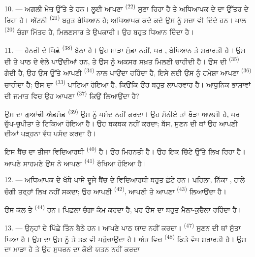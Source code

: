 10. --- ਅਗਲੀ ਮੇਜ਼ ਉੱਤੇ  ਤੇ  ਹਨ। ਲੂਈ ਆਪਣਾ
 \textsuperscript{(22)} ਸੁਣਾ ਰਿਹਾ ਹੈ ਤੇ ਅਧਿਆਪਕ ਦੇ 
ਦਾ ਉੱਤਰ ਦੇ ਰਿਹਾ ਹੈ। ਐਂਟਨੀ \textsuperscript{(21)} ਬਹੁਤ ਬੇਧਿਆਨ ਹੈ; ਅਧਿਆਪਕ ਕਦੇ
ਕਦੇ ਉਸ ਨੂੰ ਸਜ਼ਾ ਵੀ ਦਿੰਦੇ ਹਨ। ਪਾਲ \textsuperscript{(20)} ਚੰਗਾ ਮਿੱਤਰ ਹੈ, ਮਿਲਣਸਾਰ
ਤੇ ਉਪਕਾਰੀ। ਉਹ ਬਹੁਤ ਧਿਆਨ ਦਿੰਦਾ ਹੈ।

\VUsaut{4.2mm}
\VUsaut{3.2mm}

11. --- ਹੈਨਰੀ ਦੇ ਪਿੱਛੇ  \textsuperscript{(38)} ਬੈਠਾ ਹੈ। ਉਹ ਮਾੜਾ
ਮੁੰਡਾ ਨਹੀਂ, ਪਰ , ਬੇਧਿਆਨ ਤੇ ਸ਼ਰਾਰਤੀ ਹੈ। ਉਸ ਦੀ  ਤੇ
 ਪਾਠ ਦੇ ਵੇਲੇ  ਪਾਉਂਦੀਆਂ ਹਨ, ਤੇ ਉਸ ਨੂੰ ਅਕਸਰ ਸਖ਼ਤ
 ਮਿਲਣੀ ਚਾਹੀਦੀ ਹੈ। ਉਸ ਦੀ  \textsuperscript{(35)}
ਗੰਦੀ ਹੈ, ਉਹ ਉਸ ਉੱਤੇ ਆਪਣੀ  \textsuperscript{(34)} ਨਾਲ
 ਪਾਉਂਦਾ ਰਹਿੰਦਾ ਹੈ, ਇਸੇ ਲਈ ਉਸ ਨੂੰ ਹਮੇਸ਼ਾ ਆਪਣਾ
 \textsuperscript{(36)} ਚਾਹੀਦਾ ਹੈ; ਉਸ ਦਾ 
\textsuperscript{(33)} ਪਾਟਿਆ ਹੋਇਆ ਹੈ, ਕਿਉਂਕਿ ਉਹ ਬਹੁਤ ਲਾਪਰਵਾਹ ਹੈ। ਆਧੁਨਿਕ
ਭਾਸ਼ਾਵਾਂ ਦੀ ਜਮਾਤ ਵਿਚ ਉਹ ਆਪਣਾ  \textsuperscript{(37)} ਕਿਉਂ
ਲਿਆਉਂਦਾ ਹੈ?

ਉਸ ਦਾ ਗੁਆਂਢੀ ਐਡਮੰਡ \textsuperscript{(39)} ਉਸ ਨੂੰ ਪਸੰਦ ਨਹੀਂ ਕਰਦਾ। ਉਹ ਮੰਨੀਏ ਤਾਂ
ਥੋੜਾ ਆਲਸੀ ਹੈ, ਪਰ ਚੁੱਪ-ਚੁਪੀਤਾ ਤੇ ਟਿਕਿਆ ਹੋਇਆ ਹੈ। ਉਹ ਬਕਬਕ ਨਹੀਂ ਕਰਦਾ; ਬੱਸ,
ਸੁਣਨ ਦੀ ਥਾਂ ਉਹ ਆਪਣੀ  ਦੀਆਂ  ਪੜ੍ਹਨਾ ਵੱਧ ਪਸੰਦ
ਕਰਦਾ ਹੈ।

ਇਸ ਬੈਂਚ ਦਾ ਤੀਜਾ ਵਿਦਿਆਰਥੀ  \textsuperscript{(40)} ਹੈ। ਉਹ ਮਿਹਨਤੀ
ਹੈ। ਉਹ  ਇਕ ਚਿੱਟੇ  ਉੱਤੇ ਲਿਖ ਰਿਹਾ ਹੈ। ਆਪਣੇ ਸਾਹਮਣੇ
ਉਸ ਨੇ ਆਪਣਾ  \textsuperscript{(41)} ਰੱਖਿਆ ਹੋਇਆ ਹੈ।

12. --- ਅਧਿਆਪਕ ਦੇ ਖੱਬੇ ਪਾਸੇ ਦੂਜੇ ਬੈਂਚ ਦੇ ਵਿਦਿਆਰਥੀ ਬਹੁਤ ਛੋਟੇ ਹਨ। ਪਹਿਲਾ, ਨਿੱਕਾ
, ਹਾਲੇ ਚੰਗੀ ਤਰ੍ਹਾਂ ਲਿਖ ਨਹੀਂ ਸਕਦਾ; ਉਹ ਆਪਣੀ 
\textsuperscript{(42)}, ਆਪਣੀ  ਤੇ ਆਪਣਾ 
\textsuperscript{(43)} ਲਿਆਉਂਦਾ ਹੈ।

ਉਸ ਕੋਲ  ਤੇ  \textsuperscript{(44)} ਹਨ। ਪਿਛਲਾ ਚੰਗਾ
ਕੰਮ ਕਰਦਾ ਹੈ, ਪਰ ਉਸ ਦਾ  ਬਹੁਤ ਮੈਲਾ-ਕੁਚੈਲਾ ਰਹਿੰਦਾ ਹੈ।

13. --- ਉਨ੍ਹਾਂ ਦੇ ਪਿੱਛੇ ਤਿੰਨ  ਬੈਠੇ ਹਨ।  ਆਪਣੇ ਪਾਠ
ਯਾਦ ਨਹੀਂ ਕਰਦਾ।  \textsuperscript{(47)} ਸੁਣਨ ਦੀ ਥਾਂ ਸੁੱਤਾ ਪਿਆ ਹੈ।
ਉਸ ਦਾ  ਉਸ ਨੂੰ  ਤੇ  ਤਕ ਵੀ ਪਹੁੰਚਾਉਂਦਾ ਹੈ।
ਅੰਤ ਵਿਚ  \textsuperscript{(48)} ਕਿਤੇ ਵੱਧ ਸ਼ਰਾਰਤੀ ਹੈ। ਉਸ ਦਾ
 ਮਾੜਾ ਹੈ ਤੇ ਉਹ ਸੁਧਰਨ ਦਾ ਕੋਈ ਯਤਨ ਨਹੀਂ ਕਰਦਾ।

